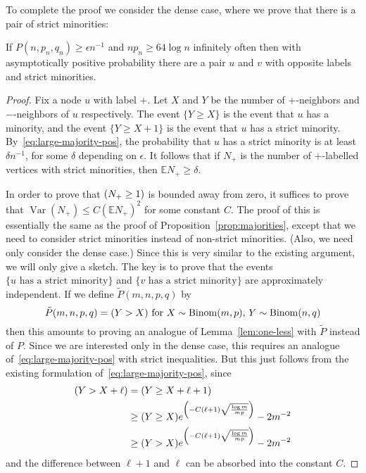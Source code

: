 \documentclass[EJP]{ejpecp}
\newcommand{\E}{\mathbb{E}}
\newcommand{\1}[1]{\mathbbm{1}_{\{#1\}}}
\let\Pr\relax
\DeclareMathOperator{\Pr}{Pr}
\DeclareMathOperator{\Var}{Var}
\DeclareMathOperator{\Binom}{Binom}
\begin{document}
To complete the proof we consider the dense case, where we prove that there is a pair of strict minorities:

\begin{lemma}\label{lem:erratum-dense}
    If $P(n, p_n, q_n) \ge \epsilon n^{-1}$ and $np_n \ge 64 \log n$ infinitely
    often then with asymptotically positive probability there are a pair $u$
    and $v$ with opposite labels and strict minorities.
\end{lemma}

\begin{proof}
    Fix a node $u$ with label $+$. Let $X$ and $Y$ be the number of
    $+$-neighbors and $-$-neighbors of $u$ respectively. The event $\{Y \ge
    X\}$ is the event that $u$ has a minority, and the event $\{Y \ge X + 1\}$
    is the event that $u$ has a strict minority.
    By~\eqref{eq:large-majority-pos}, the probability that $u$ has a strict
    minority is at least $\delta n^{-1}$, for some $\delta$ depending on
    $\epsilon$.  It follows that if $N_+$ is the number of $+$-labelled
    vertices with strict minorities, then $\E N_+ \ge \delta$.
    
    In order to
    prove that $\Pr(N_+ \ge 1)$ is bounded away from zero, it suffices to prove that
    $\Var(N_+) \le C (\E N_+)^2$ for some constant $C$. The proof of this is
    essentially the same as the proof of Proposition~\ref{prop:majorities},
    except that we need to consider strict minorities instead of non-strict
    minorities. (Also, we need only consider the dense case.) Since this
    is very similar to the existing argument, we will only give a sketch.
    The key is to prove that the events $\{u \text{ has a strict minority}\}$
    and $\{v \text{ has a strict minority}\}$ are approximately independent.
    If we define $\tilde P(m, n, p, q)$ by
    \[
        \tilde P(m, n, p, q) = \Pr(Y > X) \text{ for $X \sim \Binom(m, p)$, $Y \sim \Binom(n, q)$}
    \]
    then this amounts to proving an analogue of Lemma~\ref{lem:one-less} with
    $\tilde P$ instead of $P$. Since we are interested only in the dense case,
    this requires an analogue of~\eqref{eq:large-majority-pos} with strict inequalities.
    But this just follows from the existing formulation of~\eqref{eq:large-majority-pos},
    since
    \begin{align*}
        \Pr(Y > X + \ell)
        &= \Pr(Y \ge X + \ell + 1) \\
        &\ge \Pr(Y \ge X) e^{\left(-C (\ell+1) \sqrt{\frac{\log m}{mp}}\right)} - 2 m^{-2} \\
        &\ge \Pr(Y > X) e^{\left(-C (\ell+1) \sqrt{\frac{\log m}{mp}}\right)} - 2 m^{-2}
    \end{align*}
    and the difference between $\ell+1$ and $\ell$ can be absorbed into the constant $C$.


\end{proof}
\end{document}
